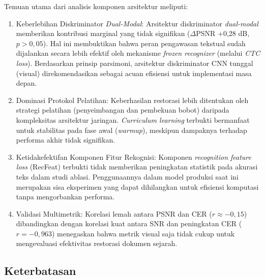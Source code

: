 Temuan utama dari analisis komponen arsitektur meliputi:
\begin{enumerate}[leftmargin=1.5em, labelsep=0.5em, itemindent=0pt, noitemsep, topsep=0pt, partopsep=0pt]
  \item Keberlebihan Diskriminator \textit{Dual-Modal}: Arsitektur diskriminator \textit{dual-modal} memberikan kontribusi marginal yang tidak signifikan ($\Delta$PSNR +0,28 dB, $p>0,05$). Hal ini membuktikan bahwa peran pengawasan tekstual sudah dijalankan secara lebih efektif oleh mekanisme \textit{frozen recognizer} (melalui \textit{CTC loss}). Berdasarkan prinsip parsimoni, arsitektur diskriminator CNN tunggal (visual) direkomendasikan sebagai acuan efisiensi untuk implementasi masa depan.
  \item Dominasi Protokol Pelatihan: Keberhasilan restorasi lebih ditentukan oleh strategi pelatihan (penyeimbangan dan pembekuan bobot) daripada kompleksitas arsitektur jaringan. \textit{Curriculum learning} terbukti bermanfaat untuk stabilitas pada fase awal (\textit{warmup}), meskipun dampaknya terhadap performa akhir tidak signifikan.
  \item Ketidakefektifan Komponen Fitur Rekognisi: Komponen \textit{recognition feature loss} (RecFeat) terbukti tidak memberikan peningkatan statistik pada akurasi teks dalam studi ablasi. Penggunaannya dalam model produksi saat ini merupakan sisa eksperimen yang dapat dihilangkan untuk efisiensi komputasi tanpa mengorbankan performa.
  \item Validasi Multimetrik: Korelasi lemah antara PSNR dan CER ($r \approx -0,15$) dibandingkan dengan korelasi kuat antara SNR dan peningkatan CER ($r = -0,963$) menegaskan bahwa metrik visual saja tidak cukup untuk mengevaluasi efektivitas restorasi dokumen sejarah.
\end{enumerate}

\subsection{Keterbatasan}
\label{subsec:keterbatasan}

